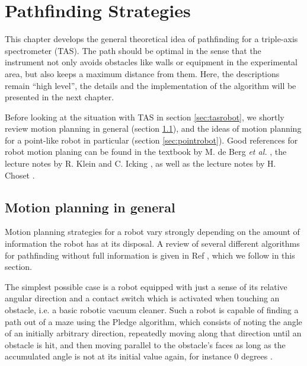 %
%

\chapter{Pathfinding Strategies}
\label{ch:paths}

This chapter develops the general theoretical idea of pathfinding for a
triple-axis spectrometer (TAS).
The path should be optimal in the sense that the instrument not only avoids 
obstacles like walls or equipment in the experimental area, but also keeps a 
maximum distance from them. 
Here, the descriptions remain ``high level'', the details and the implementation 
of the algorithm will be presented in the next chapter.

Before looking at the situation with TAS in section \ref{sec:tasrobot}, we shortly 
review motion planning in general (section \ref{sec:motionplanning}), and the ideas of
motion planning for a point-like robot in particular (section \ref{sec:pointrobot}).
Good references for robot motion planing can be found in the textbook by 
M. de Berg \textit{et al.} \cite[Ch. 13, pp. 283-306]{Berg2008}, the lecture notes by
R. Klein and C. Icking \cite[Ch. 7, pp. 313-366]{FUH_geo2020}, as well as the lecture 
notes by H. Choset \cite{Choset2010}.


\section{Motion planning in general}
\label{sec:motionplanning}
Motion planning strategies for a robot vary strongly depending on the amount of
information the robot has at its disposal. A review of several different algorithms
for pathfinding without full information is given in Ref \cite[Ch. 7, pp. 313-366]{FUH_geo2020},
which we follow in this section.

The simplest possible case is a robot equipped with just a sense of its relative
angular direction and a contact switch which is activated when touching an obstacle,
i.e. a basic robotic vacuum cleaner.
Such a robot is capable of finding a path out of a maze using the Pledge algorithm,
which consists of noting the angle of an initially arbitrary direction, repeatedly
moving along that direction until an obstacle is hit, and then moving parallel to the
obstacle's faces as long as the accumulated angle is not at its initial value again,
for instance $0$ degrees \cite[Ch. 7.2, pp. 316-322]{FUH_geo2020}.

